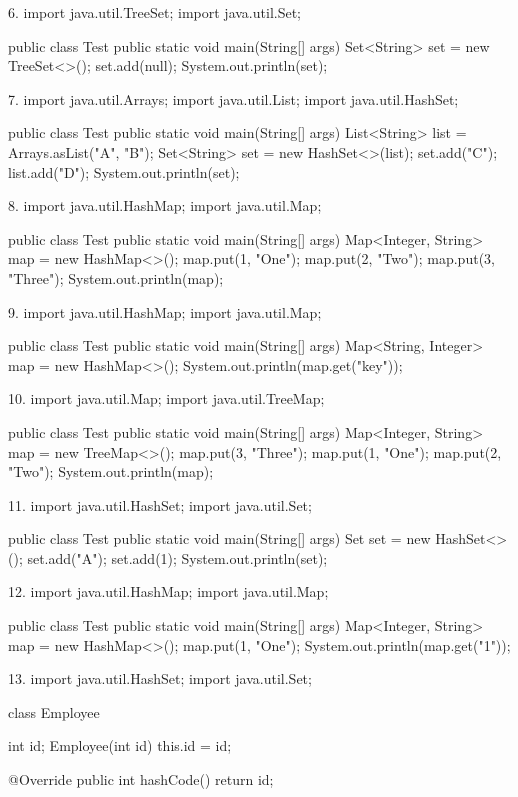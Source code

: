 6.
import java.util.TreeSet;
import java.util.Set;

public class Test {
    public static void main(String[] args) {
        Set<String> set = new TreeSet<>();
        set.add(null);
        System.out.println(set);
    }
}


7.
import java.util.Arrays;
import java.util.List;
import java.util.HashSet;

public class Test {
    public static void main(String[] args) {
        List<String> list = Arrays.asList("A", "B");
        Set<String> set = new HashSet<>(list);
        set.add("C");
        list.add("D");
        System.out.println(set);
    }
}


8.
import java.util.HashMap;
import java.util.Map;

public class Test {
    public static void main(String[] args) {
        Map<Integer, String> map = new HashMap<>();
        map.put(1, "One");
        map.put(2, "Two");
        map.put(3, "Three");
        System.out.println(map);
    }
}


9.
import java.util.HashMap;
import java.util.Map;

public class Test {
    public static void main(String[] args) {
        Map<String, Integer> map = new HashMap<>();
        System.out.println(map.get("key"));
    }
}


10.
import java.util.Map;
import java.util.TreeMap;

public class Test {
    public static void main(String[] args) {
        Map<Integer, String> map = new TreeMap<>();
        map.put(3, "Three");
        map.put(1, "One");
        map.put(2, "Two");
        System.out.println(map);
    }
}


11.
import java.util.HashSet;
import java.util.Set;

public class Test {
    public static void main(String[] args) {
        Set set = new HashSet<>();
        set.add("A");
        set.add(1);
        System.out.println(set);
    }
}


12.
import java.util.HashMap;
import java.util.Map;

public class Test {
    public static void main(String[] args) {
        Map<Integer, String> map = new HashMap<>();
        map.put(1, "One");
        System.out.println(map.get("1"));
    }
}


13.
import java.util.HashSet;
import java.util.Set;

class Employee {
    int id;
    Employee(int id) { this.id = id; }

    @Override
    public int hashCode() { return id; }
}

